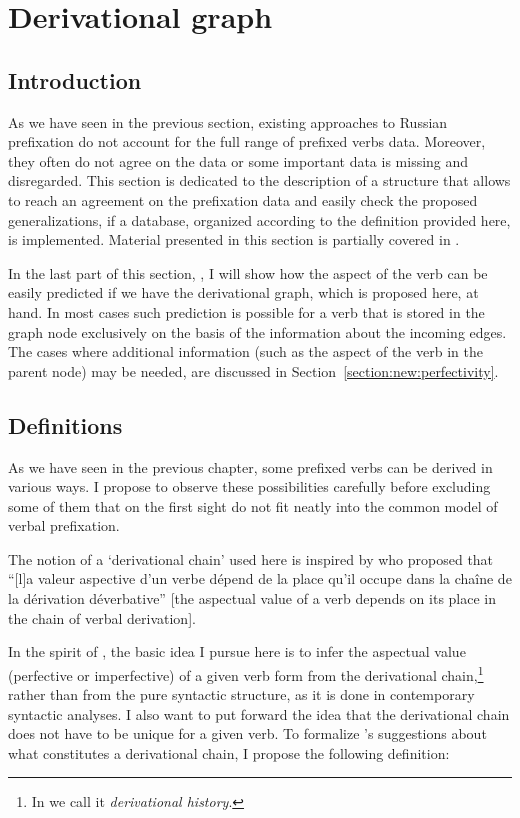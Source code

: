 
\section{Derivational graph}\label{section:graph}
\subsection{Introduction}
As we have seen in the previous section, existing approaches to Russian prefixation do not account for the full range of prefixed verbs data. Moreover, they often do not agree on the data or some important data is missing and disregarded. This section is dedicated to the description of a structure that allows to reach an agreement on the prefixation data and easily check the proposed generalizations, if a database, organized according to the definition provided here, is implemented. Material presented in this section is partially covered in \citet{ZinovaFilip:14b}.

In the last part of this section, , I will show how the aspect of the verb can be easily predicted if we have the derivational graph, which is proposed here, at hand. In most cases such prediction is possible for a verb that is stored in the graph node exclusively on the basis of the information about the incoming edges. The cases where additional information (such as the aspect of the verb in the parent node) may be needed, are discussed in Section~\ref{section:new:perfectivity}.

\subsection{Definitions}\label{section:chains:definition}
As we have seen in the previous chapter, some prefixed verbs can be derived in various ways. I propose to observe these possibilities carefully before excluding some of them that on the first sight do not fit neatly into the common model of verbal prefixation.

The notion of a `derivational chain' used here is inspired by \citet{Karcevski:27} who proposed that ``[l]a valeur aspective d'un verbe d\'{e}pend de la place qu'il occupe dans la cha\^{i}ne de la d\'{e}rivation d\'{e}verbative'' [the aspectual value of a verb depends on its place in the chain of verbal derivation].

In the spirit of \citet{Karcevski:27}, the basic idea I pursue here is to infer the aspectual value (perfective or imperfective) of a given verb form from the derivational chain,\footnote{In \citet{ZinovaFilip:14b} we call it \textit{derivational history}.} rather than from the pure syntactic structure, as it is done in contemporary syntactic analyses. I also want to put forward the idea that the derivational chain does not have to be unique for a given verb. To formalize \citeauthor{Karcevski:27}'s \citeyear{Karcevski:27} suggestions about what constitutes a derivational chain, I propose the following definition:

